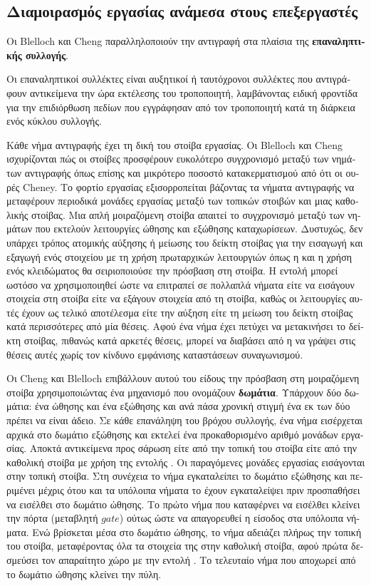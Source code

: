 \begin{greek}
\subsection{Διαμοιρασμός εργασίας ανάμεσα στους επεξεργαστές}
Οι Blelloch και Cheng \cite{DBLP:conf/pldi/BlellochC99, DBLP:conf/pldi/ChengB01}
παραλληλοποιούν την αντιγραφή στα πλαίσια της \textbf{επαναληπτικής
συλλογής}.

Οι επαναληπτικοί συλλέκτες είναι αυξητικοί ή ταυτόχρονοι συλλέκτες
που αντιγράφουν αντικείμενα την ώρα εκτέλεσης του τροποποιητή,
λαμβάνοντας ειδική φροντίδα για την επιδιόρθωση πεδίων που
εγγράφησαν από τον τροποποιητή κατά τη διάρκεια ενός κύκλου
συλλογής.

Κάθε νήμα αντιγραφής έχει τη δική του στοίβα εργασίας. Οι Blelloch
και Cheng ισχυρίζονται πώς οι στοίβες προσφέρουν ευκολότερο
συγχρονισμό μεταξύ των νημάτων αντιγραφής όπως επίσης και μικρότερο
ποσοστό κατακερματισμού από ότι οι ουρές Cheney. Το φορτίο εργασίας
εξισορροπείται βάζοντας τα νήματα αντιγραφής να μεταφέρουν περιοδικά
μονάδες εργασίας μεταξύ των τοπικών στοιβών και μιας καθολικής
στοίβας. Μια απλή μοιραζόμενη στοίβα απαιτεί το συγχρονισμό
μεταξύ των νημάτων που εκτελούν λειτουργίες ώθησης και εξώθησης
καταχωρίσεων. Δυστυχώς, δεν υπάρχει τρόπος ατομικής αύξησης
ή μείωσης του δείκτη στοίβας για την εισαγωγή και εξαγωγή ενός
στοιχείου με τη χρήση πρωταρχικών λειτουργιών όπως η 
και η χρήση ενός κλειδώματος θα σειριοποιούσε την πρόσβαση στη
στοίβα. Η εντολή  μπορεί ωστόσο να χρησιμοποιηθεί
ώστε να επιτραπεί σε πολλαπλά νήματα είτε να εισάγουν στοιχεία
στη στοίβα είτε να εξάγουν στοιχεία από τη στοίβα, καθώς
οι λειτουργίες αυτές έχουν ως τελικό αποτέλεσμα είτε την
αύξηση είτε τη μείωση του δείκτη στοίβας κατά περισσότερες
από μία θέσεις. Αφού ένα νήμα έχει πετύχει να μετακινήσει το
δείκτη στοίβας, πιθανώς κατά αρκετές θέσεις, μπορεί να διαβάσει
από η να γράψει στις θέσεις αυτές χωρίς τον κίνδυνο εμφάνισης
καταστάσεων συναγωνισμού.

Οι Cheng και Blelloch επιβάλλουν αυτού του είδους την πρόσβαση
στη μοιραζόμενη στοίβα χρησιμοποιώντας ένα μηχανισμό που
ονομάζουν \textbf{δωμάτια}. Υπάρχουν δύο δωμάτια: ένα ώθησης
και ένα εξώθησης και ανά πάσα χρονική στιγμή ένα εκ των δύο
πρέπει να είναι άδειο. Σε κάθε επανάληψη του βρόχου συλλογής,
ένα νήμα εισέρχεται αρχικά στο δωμάτιο εξώθησης και εκτελεί
ένα προκαθορισμένο αριθμό μονάδων εργασίας. Αποκτά αντικείμενα προς
σάρωση είτε από την τοπική του στοίβα είτε από την καθολική
στοίβα με χρήση της εντολής . Οι παραγόμενες
μονάδες εργασίας εισάγονται στην τοπική στοίβα. Στη συνέχεια
το νήμα εγκαταλείπει το δωμάτιο εξώθησης και περιμένει μέχρις
ότου και τα υπόλοιπα νήματα το έχουν εγκαταλείψει πριν προσπαθήσει
να εισέλθει στο δωμάτιο ώθησης. Το πρώτο νήμα που καταφέρνει
να εισέλθει κλείνει την πόρτα (μεταβλητή $gate$) ούτως ώστε
να απαγορευθεί η είσοδος στα υπόλοιπα νήματα. Ενώ βρίσκεται
μέσα στο δωμάτιο ώθησης, το νήμα αδειάζει πλήρως την τοπική
του στοίβα, μεταφέροντας όλα τα στοιχεία της στην καθολική
στοίβα, αφού πρώτα δεσμεύσει τον απαραίτητο χώρο με την εντολή
. Το τελευταίο νήμα που αποχωρεί από
το δωμάτιο ώθησης κλείνει την πύλη.


\end{greek}
